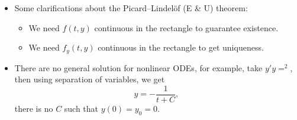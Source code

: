 \begin{itemize}
\begin{warning}
    \end{warning}
    \item Some clarifications about the Picard–Lindelöf (E \& U) theorem:
    \begin{itemize}
        \item We need $f(t,y)$ continuous in the rectangle to guarantee existence.
        \item We need $f_y(t,y)$ continuous in the rectangle to get uniqueness.
    \end{itemize}
    \item There are no general solution for nonlinear ODEs, for example, take $y'y=^2$, then using separation of variables, we get 
    \begin{equation}
        y = -\frac{1}{t+C},
    \end{equation}
    there is no $C$ such that $y(0)=y_0=0.$
\end{itemize}